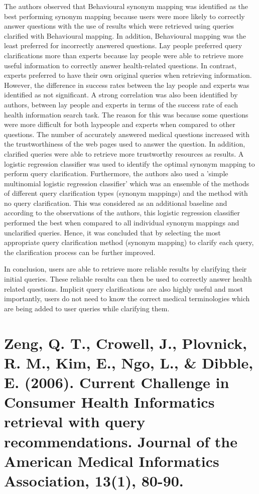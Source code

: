 \documentclass[]{article}
\begin{document}
The authors observed that Behavioural synonym mapping was identified as the best performing synonym mapping because users were more likely to correctly answer questions with the use of results which were retrieved using queries clarified with Behavioural mapping. In addition, Behavioural mapping was the least preferred for incorrectly answered questions. Lay people preferred query clarifications more than experts because lay people were able to retrieve  more useful information to correctly answer health-related questions. In contrast, experts preferred to have their own original queries when retrieving information. However, the difference in success rates between the lay people and experts was identified as not significant. A strong correlation was also been identified by authors, between lay people and experts in terms of the success rate of each health information search task. The reason for this was because some questions were more difficult for both laypeople and experts when compared to other questions. The number of accurately answered medical questions increased with the trustworthiness of the web pages used to answer the question. In addition, clarified queries were able to retrieve more trustworthy resources as results. A logistic regression classifier was used to identify the optimal synonym mapping to perform query clarification. Furthermore, the authors also used a 'simple multinomial logistic regression classifier' which was an ensemble of the methods of different query clarification types (synonym mappings) and the method with no query clarification. This was considered as an additional baseline and according to the observations of the authors, this logistic regression classifier performed the best when compared to all individual synonym mappings and unclarified queries. Hence, it was concluded that by selecting the most appropriate query clarification method (synonym mapping) to clarify each query, the clarification process can be further improved. 

In conclusion, users are able to retrieve more reliable results by clarifying their initial queries. These reliable results can then be used to correctly answer health related questions. Implicit query clarifications are also highly useful and most importantly, users do not need to know the correct medical terminologies which are being added to user queries while clarifying them.        
    	
\section{Zeng, Q. T., Crowell, J., Plovnick, R. M., Kim, E., Ngo, L., \& Dibble, E. (2006). Current Challenge in Consumer Health Informatics retrieval with query recommendations. Journal of the American Medical Informatics Association, 13(1), 80-90.}
\end{document}
